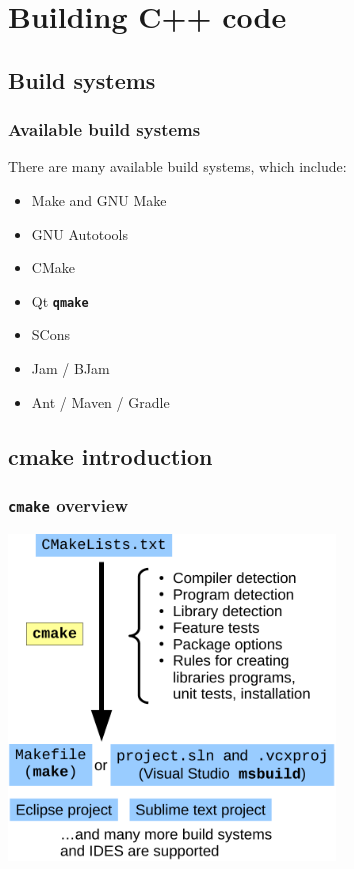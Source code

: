 \documentclass{beamer}
\newcommand{\cmd}[1]{\textbf{\texttt{#1}}}
\begin{document}
\section{Building C++ code}

\subsection{Build systems}

\begin{frame}
  \frametitle{Available build systems}
  There are many available build systems, which include:

  \begin{itemize}
  \item Make and GNU Make
  \item GNU Autotools
  \item CMake
  \item Qt \cmd{qmake}
  \item SCons
  \item Jam / BJam
  \item Ant / Maven / Gradle
  \end{itemize}
\end{frame}

\subsection{cmake introduction}

\begin{frame}
  \frametitle{\cmd{cmake} overview}
  \medskip
  \centering
  \includegraphics[width=0.65\textwidth]{cmake-flow}
\end{frame}
\end{document}
